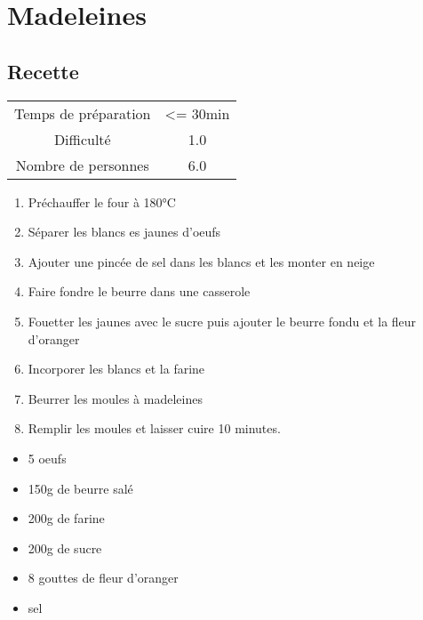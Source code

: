 \newpage
\section{Madeleines}
    \label{sec:Madeleines}
    \subsection{Recette}
    \vspace{1cm}


    \begin{center}
        \begin{tabular}{c|c}
            Temps de préparation & <= 30min \\
            Difficulté & 1.0 \\
            Nombre de personnes & 6.0 
        \end{tabular}
    \end{center}{}

    \vspace{1cm}
    \hline
    \vspace{1cm}

    \begin{minipage}{.7\textwidth}
        \begin{enumerate}
            \item Préchauffer le four à 180°C
	    \item Séparer les blancs es jaunes d'oeufs
	    \item Ajouter une pincée de sel dans les blancs et les monter en neige
	    \item Faire fondre le beurre dans une casserole
	    \item Fouetter les jaunes avec le sucre puis ajouter le beurre fondu et la fleur d'oranger
	    \item Incorporer les blancs et la farine
	    \item Beurrer les moules à madeleines
	    \item Remplir les moules et laisser cuire 10 minutes.

        \end{enumerate}
    \end{minipage}
    \begin{minipage}{.3\textwidth}
        \begin{flushleft}
        \begin{itemize}
            \item 5 oeufs
	    \item 150g de beurre salé
	    \item 200g de farine
	    \item 200g de sucre
	    \item 8 gouttes de fleur d'oranger
	    \item sel

        \end{itemize}
        \end{flushleft}
    \end{minipage}
    
